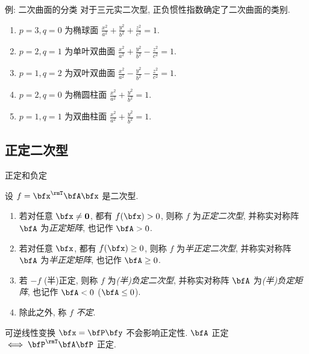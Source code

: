 \begin{frame}{例: 二次曲面的分类}
	\onslide<+->
	对于三元实二次型, 正负惯性指数确定了二次曲面的类别.
	\begin{enumerate}
		\item $p=3,q=0$ 为椭球面 $\displaystyle\frac{x^2}{a^2}+\frac{y^2}{b^2}+\frac{z^2}{c^2}=1$.
		\item $p=2,q=1$ 为单叶双曲面 $\displaystyle\frac{x^2}{a^2}+\frac{y^2}{b^2}-\frac{z^2}{c^2}=1$.
		\item $p=1,q=2$ 为双叶双曲面 $\displaystyle\frac{x^2}{a^2}-\frac{y^2}{b^2}-\frac{z^2}{c^2}=1$.
		\item $p=2,q=0$ 为椭圆柱面 $\displaystyle\frac{x^2}{a^2}+\frac{y^2}{b^2}=1$.
		\item $p=1,q=1$ 为双曲柱面 $\displaystyle\frac{x^2}{a^2}+\frac{y^2}{b^2}=1$.
	\end{enumerate}
\end{frame}



\subsection{正定二次型}

\begin{frame}{正定和负定}
	\onslide<+->
	\begin{definition}
		设 $f=\bfx^\rmT\bfA\bfx$ 是二次型.
		\begin{enumerate}
			\item 若对任意 $\bfx\neq{\bf0}$, 都有 $f(\bfx)>0$, 则称 $f$ 为\emph{正定二次型}, 并称实对称阵 $\bfA$ 为\emph{正定矩阵}, 也记作 $\bfA>0$.
			\item 若对任意 $\bfx$, 都有 $f(\bfx)\ge0$, 则称 $f$ 为\emph{半正定二次型}, 并称实对称阵 $\bfA$ 为\emph{半正定矩阵}, 也记作 $\bfA\ge0$.
			\item 若 $-f$ (半)正定, 则称 $f$ 为\emph{(半)负定二次型}, 并称实对称阵 $\bfA$ 为\emph{(半)负定矩阵}, 也记作 $\bfA<0$ ($\bfA\le0$).
			\item 除此之外, 称 $f$ \emph{不定}.
		\end{enumerate}
	\end{definition}
	\onslide<+->
	可逆线性变换 $\bfx=\bfP\bfy$ 不会影响正定性.
	\onslide<+->
	$\bfA$ 正定$\iff \bfP^\rmT\bfA\bfP$ 正定.
\end{frame}


